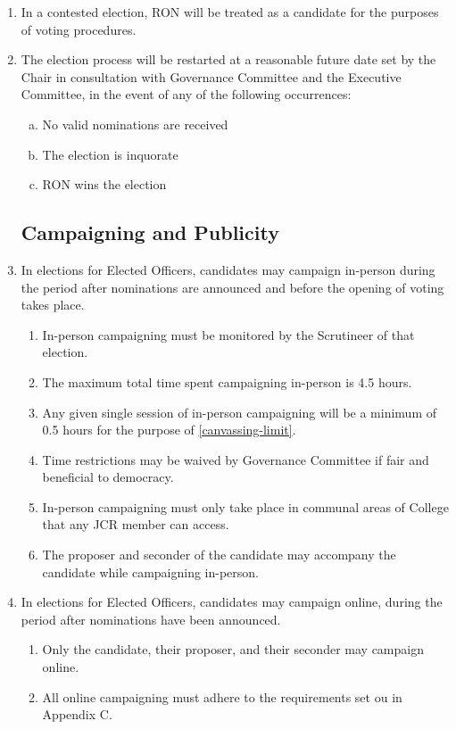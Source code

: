 \documentclass[12pt]{article}
\begin{document}
\begin{enumerate}
    \item In a contested election, RON will be treated as a candidate for the purposes of voting procedures.
    \item The election process will be restarted at a reasonable future date set by the Chair in consultation with Governance Committee and the Executive Committee, in the event of any of the following occurrences:
    \begin{enumerate}[(a)]
        \item No valid nominations are received
        \item The election is inquorate
        \item RON wins the election
    \end{enumerate}
    \subsection{Campaigning and Publicity}
    \item In elections for Elected Officers, candidates may campaign in-person during the period after nominations are announced and before the opening of voting takes place.
    \begin{enumerate}
        \item In-person campaigning must be monitored by the Scrutineer of that election.
        \item\label{canvassing-limit} The maximum total time spent campaigning in-person is 4.5 hours.
        \item Any given single session of in-person campaigning will be a minimum of 0.5 hours for the purpose of \ref{canvassing-limit}.
        \item Time restrictions may be waived by Governance Committee if fair and beneficial to democracy.
        \item In-person campaigning must only take place in communal areas of College that any JCR member can access.
        \item The proposer and seconder of the candidate may accompany the candidate while campaigning in-person.
    \end{enumerate}
    \item In elections for Elected Officers, candidates may campaign online, during the period after nominations have been announced.
    \begin{enumerate}
        \item Only the candidate, their proposer, and their seconder may campaign online.
        \item All online campaigning must adhere to the requirements set ou in Appendix C.

\end{enumerate}
\end{enumerate}
\end{document}
